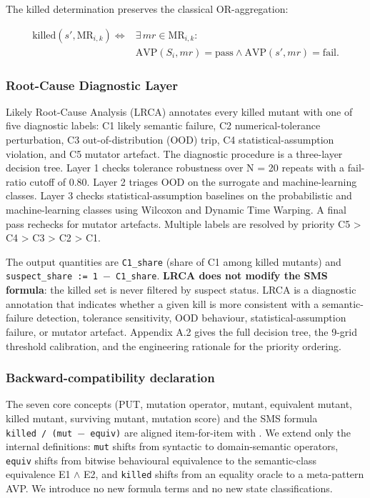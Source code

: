 \documentclass[manuscript,screen,review]{acmart}
\begin{document}
The killed determination preserves the classical OR-aggregation:

\[
\begin{aligned}
\mathrm{killed}(s', \mathrm{MR}_{i,k}) \iff{} & \exists\,mr \in \mathrm{MR}_{i,k}: \\
& \mathrm{AVP}(S_i, mr) = \text{pass} \wedge
  \mathrm{AVP}(s', mr) = \text{fail}.
\end{aligned}
\]

\subsubsection{Root-Cause Diagnostic Layer}\label{lrca-engineering-attribution-layer-descriptive-not-in-sms}

Likely Root-Cause Analysis (LRCA) annotates every killed mutant with one
of five diagnostic labels: C1 likely semantic failure, C2
numerical-tolerance perturbation, C3 out-of-distribution (OOD) trip, C4
statistical-assumption violation, and C5 mutator artefact. The diagnostic
procedure is a three-layer decision tree.
Layer 1 checks tolerance robustness over N = 20 repeats with a
fail-ratio cutoff of 0.80. Layer 2 triages OOD on the surrogate and
machine-learning classes. Layer 3 checks statistical-assumption
baselines on the probabilistic and machine-learning classes using
Wilcoxon and Dynamic Time Warping. A final pass rechecks for mutator
artefacts. Multiple labels are resolved by priority C5 \textgreater{} C4
\textgreater{} C3 \textgreater{} C2 \textgreater{} C1.

The output quantities are \texttt{C1\_share} (share of C1 among killed
mutants) and \texttt{suspect\_share\ :=\ 1\ $-$\ C1\_share}. \textbf{LRCA
does not modify the SMS formula}: the killed set is never filtered by
suspect status. LRCA is a diagnostic annotation that indicates
whether a given kill is more consistent with a semantic-failure
detection, tolerance sensitivity, OOD behaviour, statistical-assumption
failure, or mutator artefact. Appendix A.2 gives the full decision tree, the 9-grid
threshold calibration, and the engineering rationale for the priority
ordering.

\subsubsection{Backward-compatibility declaration}\label{backward-compatibility-declaration}

The seven core concepts (PUT, mutation operator, mutant, equivalent
mutant, killed mutant, surviving mutant, mutation score) and the SMS
formula
\texttt{\textbar{}killed\textbar{}\ /\ (\textbar{}mut\textbar{}\ $-$\ \textbar{}equiv\textbar{})}
are aligned item-for-item with \citet{jia2011analysis}. We extend only the
internal definitions: \texttt{mut} shifts from syntactic to
domain-semantic operators, \texttt{equiv} shifts from bitwise
behavioural equivalence to the semantic-class equivalence E1 $\wedge$ E2, and
\texttt{killed} shifts from an equality oracle to a meta-pattern AVP. We
introduce no new formula terms and no new state classifications.
\end{document}
